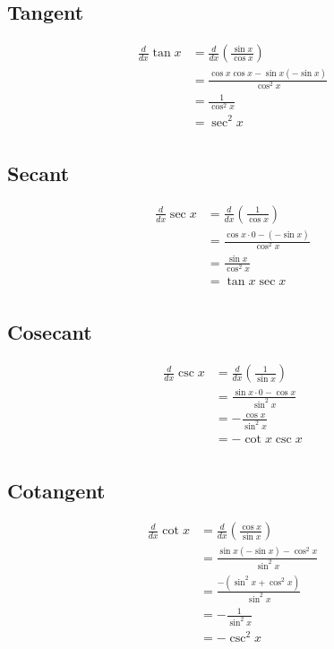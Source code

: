 \documentclass[letterpaper, landscape]{exam}
\begin{document}
  \subsection{Tangent} %
  
  \begin{align*}
    \frac{d}{dx} \tan x & = \frac{d}{dx} \left( \frac{\sin x}{\cos x}  \right) \\
                        & = \frac{\cos x \cos x - \sin x (- \sin x)}{\cos^2 x} \\
                        & = \frac{1}{\cos^2 x} \\
                        & = \sec^2 x \\
  \end{align*}
  
  \subsection{Secant} %

  \begin{align*}
    \frac{d}{dx} \sec x & = \frac{d}{dx} \left( \frac{1}{\cos x} \right) \\
                        & = \frac{\cos x \cdot 0 - (- \sin x)}{\cos^2 x} \\
                        & = \frac{\sin x}{\cos^2 x} \\
                        & = \tan x \sec x \\
  \end{align*}

  \subsection{Cosecant} %

  \begin{align*}
    \frac{d}{dx} \csc x & = \frac{d}{dx} \left( \frac{1}{\sin x}  \right) \\
                        & = \frac{\sin x \cdot 0 - \cos x}{\sin^2 x} \\
                        & = - \frac{\cos x}{\sin^2 x} \\
                        & = - \cot x \csc x \\
  \end{align*}

  \subsection{Cotangent} %
  \begin{align*}
    \frac{d}{dx} \cot x & = \frac{d}{dx} \left( \frac{\cos x}{\sin x}  \right) \\
                        & = \frac{\sin x (- \sin x) - \cos^2 x }{\sin^2 x} \\
                        & = \frac{- \left( \sin^2 x + \cos^2 x \right)}{\sin^2 x} \\
                        & = - \frac{1}{\sin^2 x} \\
                        & = -\csc^2 x \\
  \end{align*}
  
\end{document}
